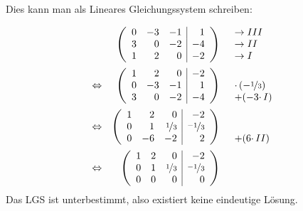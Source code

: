 Dies kann man als Lineares Gleichungssystem schreiben:

\begin{equation*}
  \begin{array}{ c r l }
    & \left(\begin{array}{rrr|r}
      0 & -3 & -1 & 1\\
      3 & 0 & -2 & -4\\
      1 & 2 & 0 & -2
    \end{array}\right) & \begin{array}{ l }
      \rightarrow III\\
      \rightarrow II\\
      \rightarrow I
    \end{array}\vspace{2mm}\\
    \Leftrightarrow  & \left(\begin{array}{rrr|r}
      1 & 2 & 0 & -2\\
      0 & -3 & -1 & 1\\
      3 & 0 & -2 & -4
    \end{array}\right) & \begin{array}{ l }
      \\
      \cdotp ( -\nicefrac{1}{3})\\
      +( -3\cdotp I)
    \end{array}\vspace{2mm}\\
    \Leftrightarrow  & \left(\begin{array}{rrr|r}
      1 & 2 & 0 & -2\\
      0 & 1 & \nicefrac{1}{3} & \nicefrac{-1}{3}\\
      0 & -6 & -2 & 2
    \end{array}\right) & \begin{array}{ l }
      \\
      \\
      +( 6\cdotp II)
    \end{array}\vspace{2mm}\\
    \Leftrightarrow  & \left(\begin{array}{rrr|r}
      1 & 2 & 0 & -2\\
      0 & 1 & \nicefrac{1}{3} & \nicefrac{-1}{3}\\
      0 & 0 & 0 & 0
    \end{array}\right) & \begin{array}{ l }
      \\
      \\
      
    \end{array}
  \end{array}
\end{equation*}
Das LGS ist unterbestimmt, also existiert keine eindeutige Lösung.

